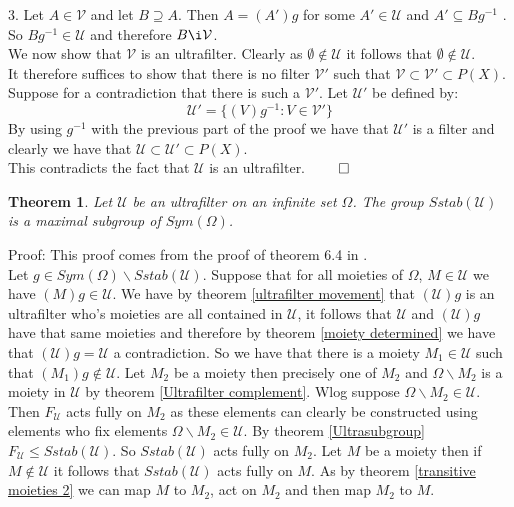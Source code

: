 \documentclass{report}
\newtheorem{theorem}{Theorem}[section]
\begin{document}
3. Let $A\in \mathcal{V}$ and let $B \supseteq A$. Then $A=(A')g$ for some $A' \in \mathcal{U}$ and  $A' \subseteq Bg^{-1}$ . So $Bg^{-1} \in \mathcal{U}$ and therefore $B \i \mathcal{V}$.\\
We now show that $\mathcal{V}$ is an ultrafilter. Clearly as $\emptyset \notin \mathcal{U}$ it follows that $\emptyset \notin \mathcal{U}$.\\
It therefore suffices to show that there is no filter $\mathcal{V}'$ such that $\mathcal{V} \subset \mathcal{V}' \subset P(X)$. Suppose for a contradiction that  there is such a $\mathcal{V}'$. Let $\mathcal{U}'$ be defined by:
$$\mathcal{U}' = \{(V)g^{-1}:V \in \mathcal{V}'\}$$
By using $g^{-1}$ with the previous part of the proof we have that $\mathcal{U}'$ is a filter and clearly we have that $\mathcal{U} \subset \mathcal{U}' \subset P(X)$.\\
This contradicts the fact that $\mathcal{U}$ is an ultrafilter. $\qed$
\begin{theorem}\label{max ultragroup}
Let $\mathcal{U}$ be an ultrafilter on an infinite set $\Omega$. The group $Sstab(\mathcal{U})$ is a maximal subgroup of $Sym(\Omega)$.
\end{theorem}\par
Proof: This proof comes from the proof of theorem 6.4 in \cite{ultrafiltermax}.\\
Let $g \in Sym(\Omega) \backslash  Sstab(\mathcal{U})$. Suppose that for all moieties of $\Omega$, $M \in \mathcal{U}$ we have $(M)g \in \mathcal{U}$. We have by theorem \ref{ultrafilter movement} that $(\mathcal{U})g$ is an ultrafilter who's moieties are all contained in $\mathcal{U}$, it follows that $\mathcal{U}$ and $(\mathcal{U})g$ have that same moieties and therefore by theorem \ref{moiety determined} we have that $(\mathcal{U})g = \mathcal{U}$ a contradiction. So we have that there is a moiety $M_1 \in \mathcal{U}$ such that $(M_1)g \notin \mathcal{U}$. Let $M_2$ be a moiety then precisely one of $M_2$ and $\Omega \backslash  M_2$ is a moiety in $\mathcal{U}$ by theorem \ref{Ultrafilter complement}. Wlog suppose $\Omega \backslash  M_2 \in \mathcal{U}$. Then $F_{\mathcal{U}}$ acts fully on $M_2$ as these elements can clearly be constructed using elements who fix elements $\Omega \backslash  M_2 \in \mathcal{U}$. By theorem \ref{Ultrasubgroup} $F_{\mathcal{U}} \leq Sstab(\mathcal{U})$. So $Sstab(\mathcal{U})$ acts fully on $M_2$. Let $M$ be a moiety then if $M \notin \mathcal{U}$ it follows that $Sstab(\mathcal{U})$ acts fully on $M$. As by theorem \ref{transitive moieties 2} we can map $M$ to $M_2$, act on $M_2$ and then map $M_2$ to $M$.\\
\end{document}
